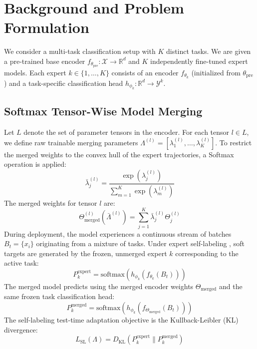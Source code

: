 \documentclass{article}
\theoremstyle{plain}
\theoremstyle{definition}
\theoremstyle{remark}
\begin{document}
\section{Background and Problem Formulation}
\label{background}
We consider a multi-task classification setup with $K$ distinct tasks. We are given a pre-trained base encoder $f_{\theta_{\text{pre}}} : \mathcal{X} \rightarrow \mathbb{R}^d$ and $K$ independently fine-tuned expert models. Each expert $k \in \{1, \dots, K\}$ consists of an encoder $f_{\theta_k}$ (initialized from $\theta_{\text{pre}}$) and a task-specific classification head $h_{\phi_k} : \mathbb{R}^d \rightarrow \mathcal{Y}^k$. 

\subsection{Softmax Tensor-Wise Model Merging}
Let $L$ denote the set of parameter tensors in the encoder. For each tensor $l \in L$, we define raw trainable merging parameters $\Lambda^{(l)} = [\lambda_1^{(l)}, \dots, \lambda_K^{(l)}]$. To restrict the merged weights to the convex hull of the expert trajectories, a Softmax operation is applied:
\begin{equation}
    \label{eq:softmax_weights}
    \bar{\lambda}_j^{(l)} = \frac{\exp(\lambda_j^{(l)})}{\sum_{m=1}^K \exp(\lambda_m^{(l)})}
\end{equation}
The merged weights for tensor $l$ are:
\begin{equation}
    \label{eq:merged_weights}
    \Theta_{\text{merged}}^{(l)}(\bar{\Lambda}^{(l)}) = \sum_{j=1}^K \bar{\lambda}_j^{(l)} \Theta_j^{(l)}
\end{equation}
During deployment, the model experiences a continuous stream of batches $B_t = \{x_i\}$ originating from a mixture of tasks. Under expert self-labeling \cite{pc_merge}, soft targets are generated by the frozen, unmerged expert $k$ corresponding to the active task:
\begin{equation}
    P_k^{\text{expert}} = \text{softmax}(h_{\phi_k}(f_{\theta_k}(B_t)))
\end{equation}
The merged model predicts using the merged encoder weights $\Theta_{\text{merged}}$ and the same frozen task classification head:
\begin{equation}
    P_k^{\text{merged}} = \text{softmax}(h_{\phi_k}(f_{\Theta_{\text{merged}}}(B_t)))
\end{equation}
The self-labeling test-time adaptation objective is the Kullback-Leibler (KL) divergence:
\begin{equation}
    L_{\text{SL}}(\Lambda) = D_{\text{KL}}(P_k^{\text{expert}} \parallel P_k^{\text{merged}})
\end{equation}
\end{document}
